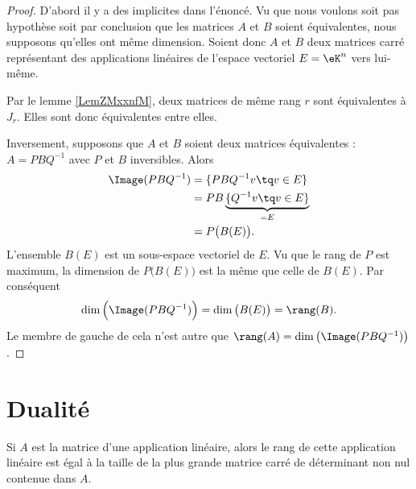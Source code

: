 \begin{proof}
    D'abord il y a des implicites dans l'énoncé. Vu que nous voulons soit pas hypothèse soit par conclusion que les matrices $A$ et \( B\) soient équivalentes, nous supposons qu'elles ont même dimension. Soient donc \( A\) et \( B\) deux matrices carré représentant des applications linéaires de l'espace vectoriel \( E=\eK^n\) vers lui-même.

    Par le lemme \ref{LemZMxxnfM}, deux matrices de même rang \( r\) sont équivalentes à \( J_r\). Elles sont donc équivalentes entre elles.

    Inversement, supposons que \( A\) et \( B\) soient deux matrices équivalentes : \( A=PBQ^{-1}\) avec \( P\) et \( B\) inversibles. Alors
    \begin{subequations}
        \begin{align}
            \Image(PBQ^{-1})&=\{ PBQ^{-1}v\tq v\in E \}\\
            &=PB\underbrace{\{ Q^{-1}v\tq v\in E \}}_{=E}\\
            &=P\big( B(E) \big).
        \end{align}
    \end{subequations}
    L'ensemble \( B(E)\) est un sous-espace vectoriel de \( E\). Vu que le rang de \( P\) est maximum, la dimension de \( P\big( B(E) \big)\) est la même que celle de \( B(E)\). Par conséquent
    \begin{equation}
        \dim\Big( \Image(PBQ^{-1}) \Big)=\dim\big( B(E) \big)=\rang(B).
    \end{equation}
    Le membre de gauche de cela n'est autre que \( \rang(A)=\dim\big( \Image(PBQ^{-1}) \big)\).
\end{proof}



\section{Dualité}

\begin{proposition} \label{PropEJBZooTNFPRj}
    Si $A$ est la matrice d'une application linéaire, alors le rang de cette application linéaire est égal à la taille de la plus grande matrice carré de déterminant non nul contenue dans $A$.
\end{proposition}

